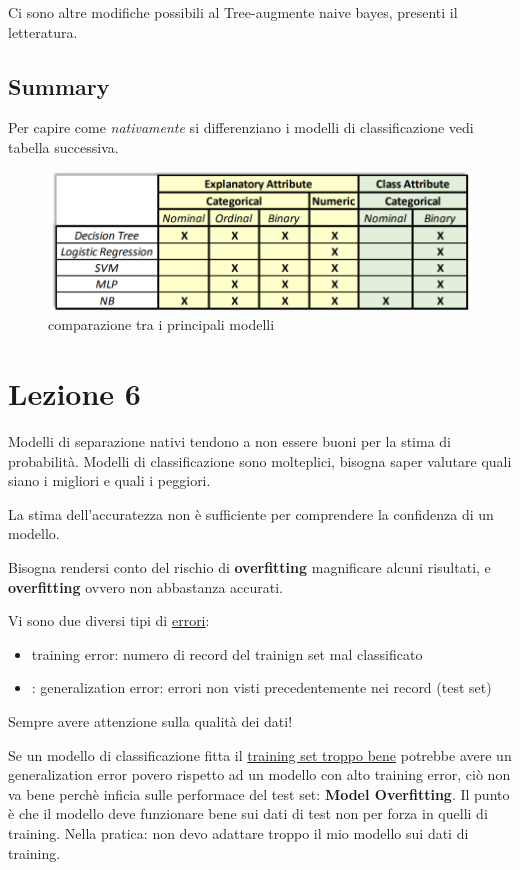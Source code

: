Ci sono altre modifiche possibili al Tree-augmente naive bayes, presenti il letteratura. 
\clearpage
\subsection{Summary}
Per capire come \textit{nativamente} si differenziano i modelli di classificazione vedi tabella successiva. 

\begin{figure}[h!]
	\centering
	\includegraphics[height=0.3 \linewidth]{pict/class_tecniques.png}
	\caption{comparazione tra i principali modelli}
\end{figure}


\section{Lezione 6}
Modelli di separazione nativi tendono a non essere buoni per la stima di probabilit\`a.
Modelli di classificazione sono molteplici, bisogna saper valutare quali siano i migliori e quali i peggiori.

La stima dell'accuratezza non \`e sufficiente per comprendere la confidenza di un modello.

Bisogna rendersi conto del rischio di \textbf{overfitting} magnificare alcuni risultati, e \textbf{overfitting} ovvero non abbastanza accurati.

Vi sono due diversi tipi di \underline{errori}:
\begin{itemize}
	\item training error: numero di record del trainign set mal classificato
	\item: generalization error: errori non visti precedentemente nei record (test set)
\end{itemize}

Sempre avere attenzione sulla qualit\`a dei dati! 

Se un modello di classificazione fitta il \underline{training set troppo bene} potrebbe avere un generalization error povero rispetto ad un modello con alto training error, ciò non va bene perch\`e inficia sulle performace del test set: \textbf{Model Overfitting}. Il punto \`e che il modello deve funzionare bene sui dati di test non per forza in quelli di training. Nella pratica: non devo adattare troppo il mio modello sui dati di training. 

